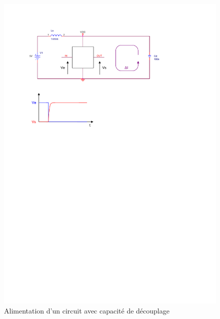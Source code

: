 \documentclass[a4paper]{article}
\begin{document}
\begin{figure}[H]
	\centering
	\includegraphics[scale=1.00]{Images/Alimentation_circuit_avec_capa_decouplage}
	\caption{Alimentation d'un circuit avec capacité de découplage
		\label{Alimentation_circuit_avec_capa_decouplage}}
\end{figure}
\end{document}
